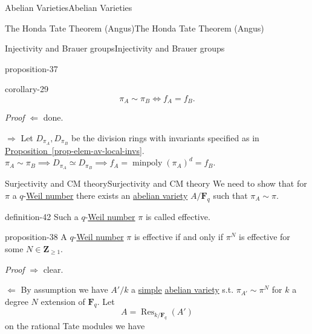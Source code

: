 \documentclass[10pt,]{book}
\makeatletter
\renewcommand*{\proofname}{Proof}
\renewenvironment{proof}[1][\proofname]{\par
  \pushQED{\qed}%
  \normalfont \topsep6\p@\@plus6\p@\relax
  \trivlist
  \item\relax
    {\itshape
    #1\@addpunct{.}}\hspace\labelsep\ignorespaces
}{%
  \popQED\endtrivlist\@endpefalse
}
\numberwithin{equation}{section}
\newcommand{\ZZ}{\mathbf{Z}}
\newcommand{\FF}{\mathbf{F}}
\DeclareMathOperator{\Res}{Res}
\makeatother
\begin{document}
\begin{chapterptx}{Abelian Varieties}{}{Abelian Varieties}{}{}
\begin{sectionptx}{The Honda Tate Theorem (Angus)}{}{The Honda Tate Theorem (Angus)}{}{}
\begin{subsectionptx}{Injectivity and Brauer groups}{}{Injectivity and Brauer groups}{}{}
\begin{proposition}{}{}{proposition-37}
\end{proposition}
\begin{corollary}{}{}{corollary-29}%
\hypertarget{p-428}{}%
%
\begin{equation*}
\pi_A\sim \pi_B \iff f_A = f_B\text{.}
\end{equation*}
%
\end{corollary}
\begin{proof}\hypertarget{proof-73}{}
\hypertarget{p-429}{}%
\(\Leftarrow\) done.%
\par
\hypertarget{p-430}{}%
\(\Rightarrow\) Let \(D_{\pi_A} , D_{\pi_B}\) be the division rings with invariants specified as in \hyperref[prop-elem-av-local-invs]{Proposition~\ref{prop-elem-av-local-invs}}. \(\pi_A\sim \pi_B \implies D_{\pi_A} \simeq D_{\pi_B} \implies f_A = \operatorname{minpoly}(\pi_A) ^d = f_B\).%
\end{proof}
\end{subsectionptx}
%
%
\typeout{************************************************}
\typeout{************************************************}
%
\begin{subsectionptx}{Surjectivity and CM theory}{}{Surjectivity and CM theory}{}{}\label{subsection-38}
\hypertarget{p-431}{}%
We need to show that for \(\pi\) a \(q\)-\hyperref[sec-honda-tate]{Weil number} there exists an \hyperref[def-buntes-abvar]{abelian variety} \(A/\FF_q\) such that \(\pi_A \sim \pi\).%
\begin{definition}{}{definition-42}%
\hypertarget{p-432}{}%
Such a \(q\)-\hyperref[sec-honda-tate]{Weil number} \(\pi\) is called effective.%
\end{definition}
\begin{proposition}{}{}{proposition-38}%
\hypertarget{p-433}{}%
A \(q\)-\hyperref[sec-honda-tate]{Weil number} \(\pi\) is effective if and only if \(\pi^N\) is effective for some \(N\in \ZZ_{\ge 1}\).%
\end{proposition}
\begin{proof}\hypertarget{proof-74}{}
\hypertarget{p-434}{}%
\(\Rightarrow\) clear.%
\par
\hypertarget{p-435}{}%
\(\Leftarrow\) By assumption we have \(A'/k\) a \hyperref[def-simple-av]{simple} \hyperref[def-buntes-abvar]{abelian variety} s.t. \(\pi_{A'} \sim  \pi^N\) for \(k\) a degree \(N\) extension of \(\FF_q\). Let%
\begin{equation*}
A = \Res_{k/\FF_q}(A')
\end{equation*}
on the rational Tate modules we have%

\end{proof}
\end{subsectionptx}
\end{sectionptx}
\end{chapterptx}
\end{document}

